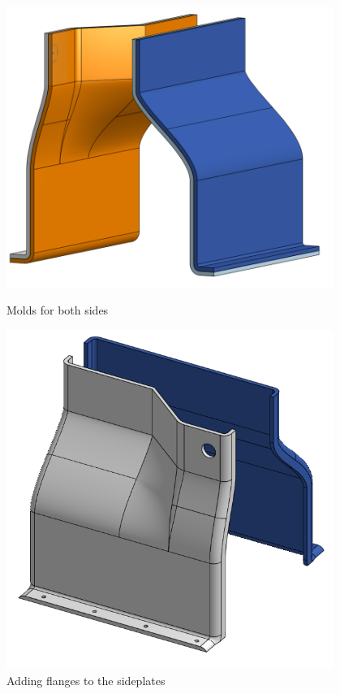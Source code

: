  

\begin{figure}[ht]
\centering
\begin{minipage}[b]{.48\textwidth}
  \centering
  \includegraphics[width=0.95\textwidth]{Meetings/November/11-27-21/11-22-21_CAD_Figure1 - Nathan Forrer.PNG}
  \caption{Molds for both sides}
  \label{fig:112721_1}
\end{minipage}%
\hfill%
\begin{minipage}[b]{.48\textwidth}
  \centering
  \includegraphics[width=0.95\textwidth]{Meetings/November/11-27-21/11-22-21_CAD_Figure2 - Nathan Forrer.PNG}
  \caption{Adding flanges to the sideplates}
  \label{fig:112721_2}
\end{minipage}
\end{figure}

